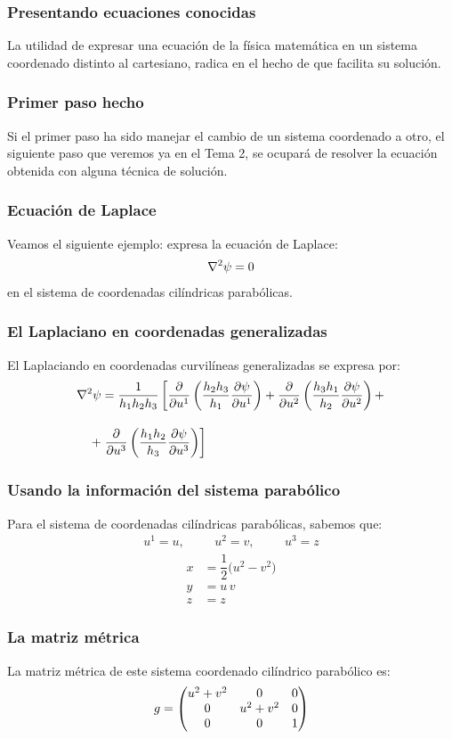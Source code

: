\documentclass[12pt]{beamer}
\begin{document}
\begin{frame}
\frametitle{Presentando ecuaciones conocidas}
La utilidad de expresar una ecuación de la física matemática en un sistema coordenado distinto al cartesiano, radica en el hecho de que facilita su solución.
\end{frame}
\begin{frame}
\frametitle{Primer paso hecho}
Si el primer paso ha sido manejar el cambio de un sistema coordenado a otro, el siguiente paso que veremos ya en el Tema 2, se ocupará de resolver la ecuación obtenida con alguna técnica de solución.
\end{frame}
\begin{frame}
\frametitle{Ecuación de Laplace}
Veamos el siguiente ejemplo: expresa la ecuación de Laplace:
\begin{align*}
\laplacian{\psi} = 0
\end{align*}
en el sistema de coordenadas cilíndricas parabólicas.
\end{frame}
\begin{frame}
\frametitle{El Laplaciano en coordenadas generalizadas}
El Laplaciando en coordenadas curvilíneas generalizadas se expresa por:
\begin{align*}
\laplacian{\psi} &= \dfrac{1}{h_{1} h_{2} h_{3}} \left[ \pdv{u^{1}} \left( \dfrac{h_{2} h_{3}}{h_{1}} \pdv{\psi}{u^{1}} \right) + \pdv{u^{2}} \left( \dfrac{h_{3} h_{1}}{h_{2}} \pdv{\psi}{u^{2}} \right) + \right. \\[1em]
+& \left. \pdv{u^{3}} \left( \dfrac{h_{1} h_{2}}{h_{3}} \pdv{\psi}{u^{3}} \right) \right]
\end{align*}
\end{frame}
\begin{frame}
\frametitle{Usando la información del sistema parabólico}
Para el sistema de coordenadas cilíndricas parabólicas, sabemos que: \pause
\begin{align*}
u^{1} = u, \hspace{1cm} u^{2} = v, \hspace{1cm} u^{3} = z
\end{align*}
\pause
\begin{align*}
x &= \dfrac{1}{2}  \big( u^{2} - v^{2} \big) \\[0.5em]
y &=  u \, v \\[0.5em]
z &= z
\end{align*}
\end{frame}
\begin{frame}
\frametitle{La matriz métrica}
La matriz métrica de este sistema coordenado cilíndrico parabólico es:
\begin{align*}
g = \mqty(
u^{2} + v^{2} & 0 & 0 \\
0 & u^{2} + v^{2} & 0 \\
0 & 0 & 1
)
\end{align*}
\end{frame}
\end{document}
